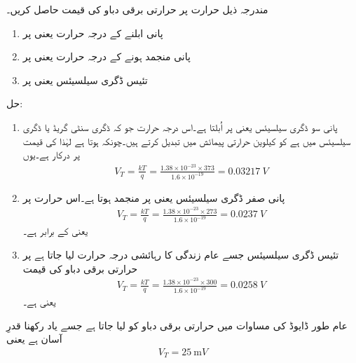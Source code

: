 مندرجہ ذیل حرارت پر حرارتی برقی دباو   کی قیمت حاصل کریں۔
\begin{enumerate}
\item
پانی ابلنے کے درجہ حرارت یعنی   پر

\item

پانی منجمد ہونے کے درجہ حرارت یعنی  پر
\item

تئیس ڈگری سیلسیئس یعنی   پر
\end{enumerate}




حل:
\begin{enumerate}
\item
پانی سو ڈگری سیلسیئس یعنی  پر اُبلتا ہے۔اس درجہ حرارت جو کہ ڈگری سنٹی گریڈ یا ڈگری سیلسیئس   میں ہے کو کیلوین  حرارتی پیمائش میں تبدیل کرتے ہیں۔چونکہ  ہوتا ہے لہٰذا  کی قیمت  پر درکار ہے۔یوں 
\begin{align*}
V_T =\frac{k T}{q} =\frac{1.38 \times 10^{-23} \times 373}{1.6 \times 10^{-19}}=\SI{0.03217}{V}
\end{align*}

\item
پانی صفر ڈگری سیلسیئس یعنی  پر منجمد ہوتا ہے۔اس حرارت پر
\begin{align*}
V_T=\frac{k T}{q}=\frac{1.38 \times 10^{-23} \times 273}{1.6 \times 10^{-19}}=\SI{0.0237}{V}
\end{align*}
یعنی  کے برابر ہے۔
\item
تئیس ڈگری سیلسیئس جسے عام زندگی کا رہائشی درجہ حرارت لیا جاتا ہے پر حرارتی برقی دباو کی قیمت 
\begin{align*}
V_T=\frac{k T}{q}=\frac{1.38 \times 10^{-23} \times 300}{1.6 \times 10^{-19}}=\SI{0.0258}{V}
\end{align*}
یعنی   ہے۔
\end{enumerate}
عام طور ڈایوڈ کی مساوات میں حرارتی برقی دباو کو  لیا جاتا ہے جسے یاد رکھنا قدرِ آسان ہے یعنی
\begin{align}
V_T=\SI{25}{\milli V}
\end{align}

